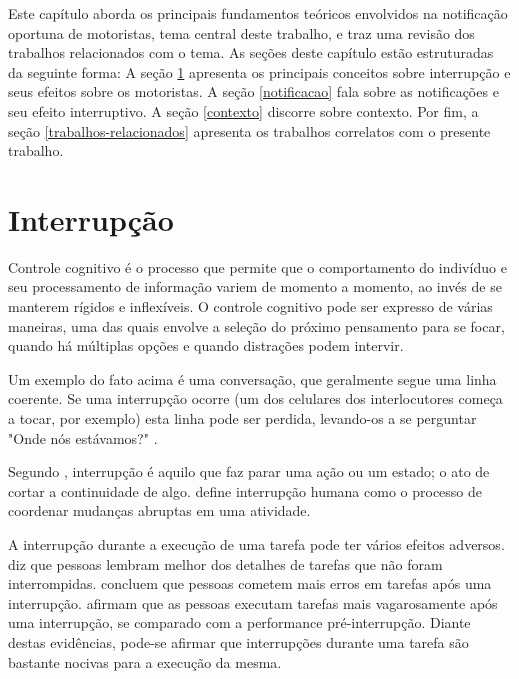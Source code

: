 \label{revisao-lit}
Este capítulo aborda os principais fundamentos teóricos envolvidos na notificação oportuna de motoristas,
tema central deste trabalho, e traz uma revisão dos trabalhos relacionados com o tema. As seções deste capítulo
estão estruturadas da seguinte forma: A seção \ref{interrupcao} apresenta os principais conceitos sobre interrupção
e seus efeitos sobre os motoristas. A seção \ref{notificacao} fala sobre as notificações e seu efeito interruptivo.
A seção \ref{contexto} discorre sobre contexto. Por fim, a seção \ref{trabalhos-relacionados} apresenta os trabalhos
correlatos com o presente trabalho.

\section{Interrupção}
\label{interrupcao}
Controle cognitivo é o processo que permite que o comportamento do indivíduo e seu processamento de informação variem de momento a
momento, ao invés de se manterem rígidos e inflexíveis. O controle cognitivo pode ser expresso de várias maneiras, uma das quais
envolve a seleção do próximo pensamento para se focar, quando há múltiplas opções e quando distrações podem intervir.

Um exemplo do fato acima é uma conversação, que geralmente segue uma linha coerente. Se uma interrupção ocorre (um dos celulares dos
interlocutores começa a tocar, por exemplo) esta linha pode ser perdida, levando-os a se perguntar "Onde nós estávamos?" \cite{altmann2014momentary}.

Segundo , interrupção é aquilo que faz parar uma ação ou um estado; o ato de cortar a continuidade de
algo.  define interrupção humana como o processo de coordenar mudanças abruptas em uma atividade.

A interrupção durante a execução de uma tarefa pode ter vários efeitos adversos.  diz
que pessoas lembram melhor dos detalhes de tarefas que não foram interrompidas.  concluem que
pessoas cometem mais erros em tarefas após uma interrupção.  afirmam que as pessoas executam tarefas
mais vagarosamente após uma interrupção, se comparado com a performance pré-interrupção. Diante destas evidências, pode-se
afirmar que interrupções durante uma tarefa são bastante nocivas para a execução da mesma.

